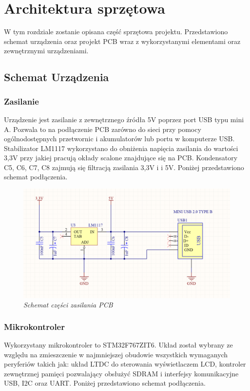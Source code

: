 \documentclass[eng,printmode]{mgr}
\begin{document}
\chapter{ Architektura sprzętowa}
W tym rozdziale zostanie opisana część sprzętowa projektu. Przedstawiono schemat urządzenia oraz projekt PCB wraz z wykorzystanymi elementami oraz zewnętrznymi urządzeniami.


\section{ Schemat Urządzenia}
\subsection*{Zasilanie}
Urządzenie jest zasilanie z zewnętrznego źródła 5V poprzez port USB typu mini A. Pozwala to na podłączenie PCB zarówno do sieci przy pomocy ogólnodostępnych przetwornic i akumulatorów lub portu w komputerze USB. Stabilizator LM1117 wykorzystano do obniżenia napięcia zasilania do wartości 3,3V przy jakiej pracują okłady scalone znajdujące się na PCB. Kondensatory C5, C6, C7, C8 zajmują się filtracją zasilania 3,3V i i 5V.
Poniżej przedstawiono schemat podłączenia.

\begin{figure}[!h]
    \centering
    \includegraphics[width=\textwidth]{schematics/power.png}
    \caption{\textit{Schemat części zasilania PCB}}
\end{figure}
\subsection*{Mikrokontroler}
Wykorzystany mikrokontroler to STM32F767ZIT6. Układ został wybrany ze względu na zmieszczenie w najmniejszej obudowie wszystkich wymaganych peryferiów takich jak: układ LTDC do sterowania wyświetlaczem LCD, kontroler zewnętrznej pamięci pozwalający obsłużyć SDRAM i interfejsy komunikacyjne USB, I2C oraz UART. Poniżej przedstawiono schemat podłączenia.
\end{document}
